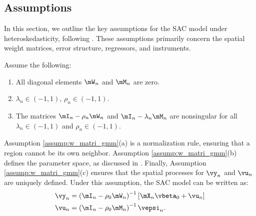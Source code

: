 \documentclass[english,12pt]{book}\usepackage[]{graphicx}\usepackage[]{xcolor}
\begin{document}
% 






\subsection{Assumptions}

In this section, we outline the key assumptions for the SAC model under heteroskedasticity, following \cite{arraiz2010spatial}. These assumptions primarily concern the spatial weight matrices, error structure, regressors, and instruments.

\begin{assumption}\label{assump:w_matri_gmm}
	Assume the following:
	\begin{enumerate}
		\item All diagonal elements $\mW_n$ and $\mM_n$ are zero.
		\item $\lambda_n\in (-1, 1)$, $\rho_n \in (-1, 1)$.
		\item The matrices $\mI_n - \rho_n \mW_n$ and $\mI_n - \lambda_n \mM_n$ are nonsingular for all $\lambda_n\in (-1, 1)$ and $\rho_n \in (-1, 1)$.
	\end{enumerate}
\end{assumption}	

Assumption \ref{assump:w_matri_gmm}(a) is a normalization rule, ensuring that a region cannot be its own neighbor. Assumption \ref{assump:w_matri_gmm}(b) defines the parameter space, as discussed in \citet[section 2.2]{kelejian2010specification}. Finally, Assumption \ref{assump:w_matri_gmm}(c) ensures that the spatial processes for $\vy_n$ and $\vu_n$ are uniquely defined. Under this assumption, the SAC model can be written as:
\begin{equation*}
	\begin{aligned}
	\vy_n  & = \left(\mI_n - \rho_0 \mW_n\right)^{-1}\left[\mX_n\vbeta_0 + \vu_n\right] \\
	\vu_n  & = \left(\mI_n -  \rho_0 \mM_n\right)^{-1}\vepsi_n.
	\end{aligned}
\end{equation*}
\end{document}

